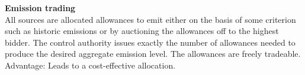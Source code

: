 	\textbf{Emission trading} \\
        All sources are allocated allowances to emit either on the basis of some criterion such as historic emissions or by auctioning the allowances off to the highest bidder.
        The control authority issues exactly the number of allowances needed to produce the desired aggregate emission level.
        The allowances are freely tradeable.
        Advantage: Leads to a cost-effective allocation.
